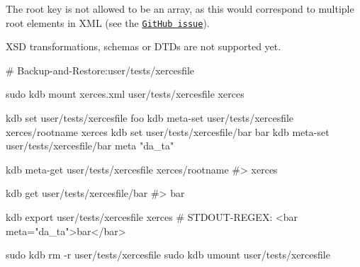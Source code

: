 The root key is not allowed to be an array, as this would correspond to multiple root elements in X\+ML (see the \href{https://github.com/ElektraInitiative/libelektra/issues/1451}{\tt Git\+Hub issue}).

X\+SD transformations, schemas or D\+T\+Ds are not supported yet.


\begin{DoxyCode}
# Backup-and-Restore:user/tests/xercesfile

sudo kdb mount xerces.xml user/tests/xercesfile xerces

kdb set user/tests/xercesfile foo
kdb meta-set user/tests/xercesfile xerces/rootname xerces
kdb set user/tests/xercesfile/bar bar
kdb meta-set user/tests/xercesfile/bar meta "da\_ta"

kdb meta-get user/tests/xercesfile xerces/rootname
#> xerces

kdb get user/tests/xercesfile/bar
#> bar

kdb export user/tests/xercesfile xerces
# STDOUT-REGEX: <bar meta="da\_ta">bar</bar>

sudo kdb rm -r user/tests/xercesfile
sudo kdb umount user/tests/xercesfile
\end{DoxyCode}
 